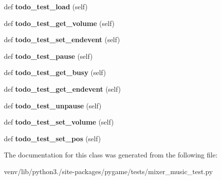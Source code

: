 \begin{DoxyCompactItemize}
def {\bfseries todo\+\_\+test\+\_\+load} (self)
\item 
\mbox{\label{classpygame_1_1tests_1_1mixer__music__test_1_1_mixer_music_module_test_a4652b0330563512c7852039055b36507}} 
def {\bfseries todo\+\_\+test\+\_\+get\+\_\+volume} (self)
\item 
\mbox{\label{classpygame_1_1tests_1_1mixer__music__test_1_1_mixer_music_module_test_a9c660b78e36819818f74339822cc055b}} 
def {\bfseries todo\+\_\+test\+\_\+set\+\_\+endevent} (self)
\item 
\mbox{\label{classpygame_1_1tests_1_1mixer__music__test_1_1_mixer_music_module_test_a677278fe04213725cd8e16411e215ee9}} 
def {\bfseries todo\+\_\+test\+\_\+pause} (self)
\item 
\mbox{\label{classpygame_1_1tests_1_1mixer__music__test_1_1_mixer_music_module_test_a083305f496a9914bd05ee4fb90036591}} 
def {\bfseries todo\+\_\+test\+\_\+get\+\_\+busy} (self)
\item 
\mbox{\label{classpygame_1_1tests_1_1mixer__music__test_1_1_mixer_music_module_test_ad9c5d52463604e301c896953ae67896d}} 
def {\bfseries todo\+\_\+test\+\_\+get\+\_\+endevent} (self)
\item 
\mbox{\label{classpygame_1_1tests_1_1mixer__music__test_1_1_mixer_music_module_test_a13d7891827d80d33dcfae8f7ea09ab05}} 
def {\bfseries todo\+\_\+test\+\_\+unpause} (self)
\item 
\mbox{\label{classpygame_1_1tests_1_1mixer__music__test_1_1_mixer_music_module_test_aca76124d8ee036ff959ef3f2cb87d95f}} 
def {\bfseries todo\+\_\+test\+\_\+set\+\_\+volume} (self)
\item 
\mbox{\label{classpygame_1_1tests_1_1mixer__music__test_1_1_mixer_music_module_test_acb2d4f939fb3aee2f7f15050a40bea19}} 
def {\bfseries todo\+\_\+test\+\_\+set\+\_\+pos} (self)
\end{DoxyCompactItemize}


The documentation for this class was generated from the following file\+:\begin{DoxyCompactItemize}
\item 
venv/lib/python3./site-\/packages/pygame/tests/mixer\+\_\+music\+\_\+test.\+py\end{DoxyCompactItemize}

